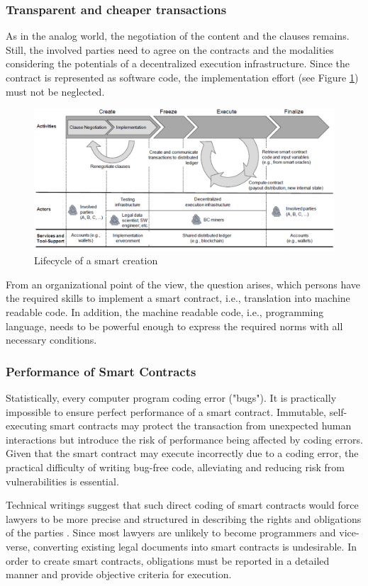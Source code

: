 \subsubsection{Transparent and cheaper transactions}
As in the analog world, the negotiation of the
content and the clauses remains. Still, the involved parties need to agree on the contracts and
the modalities considering the potentials of a decentralized execution infrastructure.
Since the contract is represented as software code, the implementation effort (see Figure \ref{fig:smartcontractcreation})
must not be neglected.
\begin{figure}[H]
	\centering
	\includegraphics[width=0.7\linewidth]{Images/smartContractCreation}
	\caption{Lifecycle of a smart creation \cite{Sillaber2017}}
	\label{fig:smartcontractcreation}
\end{figure}

 From an organizational point of the view, the question arises, which
persons have the required skills to implement
a smart contract, i.e., translation into machine readable code. In addition, the machine readable
code, i.e., programming language, needs to be powerful enough to express the required norms
with all necessary conditions.


\subsubsection{Performance of Smart Contracts}
Statistically, every computer program coding error ("bugs"). It is practically impossible to ensure perfect performance of a smart contract. Immutable, self-executing smart contracts may protect  
the transaction from unexpected human interactions but introduce the risk of
performance being affected by coding errors. Given that the smart contract may execute incorrectly due to a coding error, the practical difficulty of writing bug-free code, alleviating and reducing risk from vulnerabilities is essential.


Technical writings suggest
that such direct coding of smart contracts would force lawyers to be more precise and
structured in describing the rights and obligations of the parties \cite{stepWolf}. Since most lawyers are unlikely to become programmers and vice-verse, converting existing legal documents into smart contracts is undesirable. In order to create smart contracts, obligations must be reported in a  detailed manner and provide objective criteria for execution.


